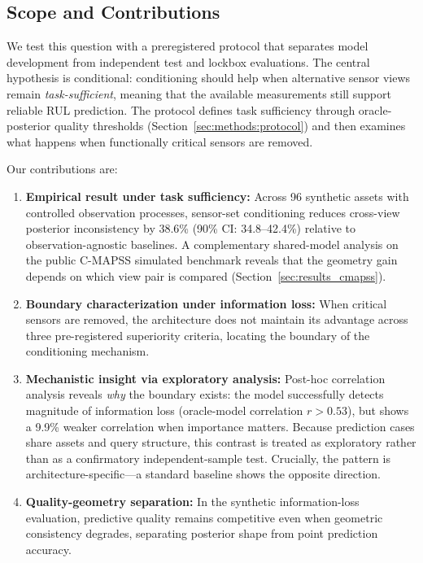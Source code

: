 \subsection{Scope and Contributions}

We test this question with a preregistered protocol that separates model development from independent test and lockbox evaluations. The central hypothesis is conditional: conditioning should help when alternative sensor views remain \emph{task-sufficient}, meaning that the available measurements still support reliable RUL prediction. The protocol defines task sufficiency through oracle-posterior quality thresholds (Section~\ref{sec:methods:protocol}) and then examines what happens when functionally critical sensors are removed.

Our contributions are:

\begin{enumerate}
    \item \textbf{Empirical result under task sufficiency:} Across 96 synthetic assets with controlled observation processes, sensor-set conditioning reduces cross-view posterior inconsistency by 38.6\% (90\% CI: 34.8--42.4\%) relative to observation-agnostic baselines. A complementary shared-model analysis on the public C-MAPSS simulated benchmark reveals that the geometry gain depends on which view pair is compared (Section~\ref{sec:results_cmapss}).

    \item \textbf{Boundary characterization under information loss:} When critical sensors are removed, the architecture does not maintain its advantage across three pre-registered superiority criteria, locating the boundary of the conditioning mechanism.

    \item \textbf{Mechanistic insight via exploratory analysis:} Post-hoc correlation analysis reveals \emph{why} the boundary exists: the model successfully detects magnitude of information loss (oracle-model correlation $r>0.53$), but shows a 9.9\% weaker correlation when importance matters. Because prediction cases share assets and query structure, this contrast is treated as exploratory rather than as a confirmatory independent-sample test. Crucially, the pattern is architecture-specific---a standard baseline shows the opposite direction.

    \item \textbf{Quality-geometry separation:} In the synthetic information-loss evaluation, predictive quality remains competitive even when geometric consistency degrades, separating posterior shape from point prediction accuracy.
\end{enumerate}

